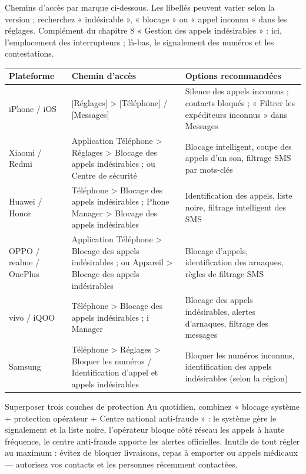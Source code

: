 
Chemins d'accès par marque ci-dessous. Les libellés peuvent varier selon la version ; recherchez « indésirable », « blocage » ou « appel inconnu » dans les réglages. Complément du chapitre 8 « Gestion des appels indésirables » : ici, l'emplacement des interrupteurs ; là-bas, le signalement des numéros et les contestations.

\begin{center}
\begin{tabularx}{\linewidth}{|X|X|X|}
\hline
\textbf{Plateforme} & \textbf{Chemin d'accès} & \textbf{Options recommandées} \tabularnewline
\hline
iPhone / iOS & {}[Réglages] > [Téléphone] / [Messages] & Silence des appels inconnus ; contacts bloqués ; « Filtrer les expéditeurs inconnus » dans Messages \tabularnewline
Xiaomi / Redmi & Application Téléphone > Réglages > Blocage des appels indésirables ; ou Centre de sécurité & Blocage intelligent, coupe des appels d'un son, filtrage SMS par mots-clés \tabularnewline
Huawei / Honor & Téléphone > Blocage des appels indésirables ; Phone Manager > Blocage des appels indésirables & Identification des appels, liste noire, filtrage intelligent des SMS \tabularnewline
OPPO / realme / OnePlus & Application Téléphone > Blocage des appels indésirables ; ou Appareil > Blocage des appels indésirables & Blocage d'appels, identification des arnaques, règles de filtrage SMS \tabularnewline
vivo / iQOO & Téléphone > Blocage des appels indésirables ; i Manager & Blocage des appels indésirables, alertes d'arnaques, filtrage des messages \tabularnewline
Samsung & Téléphone > Réglages > Bloquer les numéros / Identification d'appel et appels indésirables & Bloquer les numéros inconnus, identification des appels indésirables (selon la région) \tabularnewline
\hline
\end{tabularx}
\end{center}

\begin{tcbinfo}{Superposer trois couches de protection}
Au quotidien, combinez « blocage système + protection opérateur + Centre national anti-fraude » : le système gère le signalement et la liste noire, l'opérateur bloque côté réseau les appels à haute fréquence, le centre anti-fraude apporte les alertes officielles. Inutile de tout régler au maximum : évitez de bloquer livraisons, repas à emporter ou appels médicaux — autorisez vos contacts et les personnes récemment contactées.

\end{tcbinfo}

